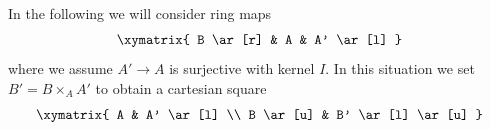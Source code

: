\begin{situation}
\label{situation-module-over-fibre-product}
In the following we will consider ring maps
$$
\xymatrix{
B \ar[r] & A & A' \ar[l]
}
$$
where we assume $A' \to A$ is surjective with kernel $I$.
In this situation we set $B' = B \times_A A'$ to
obtain a cartesian square
$$
\xymatrix{
A & A' \ar[l] \\
B \ar[u] & B' \ar[l] \ar[u]
}
$$
\end{situation}